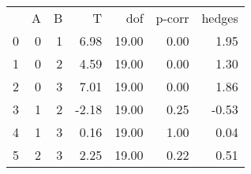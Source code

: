 \begin{tabular}{lrrrrrr}
 & A & B & T & dof & p-corr & hedges \\
0 & 0 & 1 & 6.98 & 19.00 & 0.00 & 1.95 \\
1 & 0 & 2 & 4.59 & 19.00 & 0.00 & 1.30 \\
2 & 0 & 3 & 7.01 & 19.00 & 0.00 & 1.86 \\
3 & 1 & 2 & -2.18 & 19.00 & 0.25 & -0.53 \\
4 & 1 & 3 & 0.16 & 19.00 & 1.00 & 0.04 \\
5 & 2 & 3 & 2.25 & 19.00 & 0.22 & 0.51 \\
\end{tabular}
